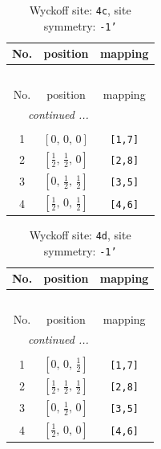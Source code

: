 \documentclass[fleqn,8pt]{jsarticle}
\begin{document}
\renewcommand{\arraystretch}{1.2}
\begin{longtable}{ccc}
\caption{Wyckoff site: {\tt 4c}, site symmetry: {\tt -1'}}
 \\
 \hline \hline
No. & position & mapping \\ \hline \endfirsthead

\multicolumn{2}{l}{\tablename\ \thetable{}} \\
 \hline \hline
No. & position & mapping \\ \hline \endhead

 \hline \hline
\multicolumn{2}{r}{\footnotesize\it continued ...} \\ \endfoot

 \hline \hline
\multicolumn{2}{r}{} \\ \endlastfoot

1 & $\left[ 0,\, 0,\, 0 \right]$ & {\tt [1,7]} \\ \hline
2 & $\left[ \frac{1}{2},\, \frac{1}{2},\, 0 \right]$ & {\tt [2,8]} \\ \hline
3 & $\left[ 0,\, \frac{1}{2},\, \frac{1}{2} \right]$ & {\tt [3,5]} \\ \hline
4 & $\left[ \frac{1}{2},\, 0,\, \frac{1}{2} \right]$ & {\tt [4,6]} \\
\end{longtable}
\renewcommand{\arraystretch}{1.2}
\begin{longtable}{ccc}
\caption{Wyckoff site: {\tt 4d}, site symmetry: {\tt -1'}}
 \\
 \hline \hline
No. & position & mapping \\ \hline \endfirsthead

\multicolumn{2}{l}{\tablename\ \thetable{}} \\
 \hline \hline
No. & position & mapping \\ \hline \endhead

 \hline \hline
\multicolumn{2}{r}{\footnotesize\it continued ...} \\ \endfoot

 \hline \hline
\multicolumn{2}{r}{} \\ \endlastfoot

1 & $\left[ 0,\, 0,\, \frac{1}{2} \right]$ & {\tt [1,7]} \\ \hline
2 & $\left[ \frac{1}{2},\, \frac{1}{2},\, \frac{1}{2} \right]$ & {\tt [2,8]} \\ \hline
3 & $\left[ 0,\, \frac{1}{2},\, 0 \right]$ & {\tt [3,5]} \\ \hline
4 & $\left[ \frac{1}{2},\, 0,\, 0 \right]$ & {\tt [4,6]} \\
\end{longtable}
\end{document}
